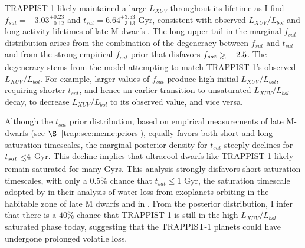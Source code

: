 TRAPPIST-1 likely maintained a large $L_{XUV}$ throughout its lifetime as I find $f_{sat} = -3.03^{+0.23}_{-0.12}$ and $t_{sat} = 6.64^{+3.53}_{-3.13}$ Gyr, consistent with observed $L_{XUV}/L_{bol}$ and long activity lifetimes of late M dwarfs \citep{West2008,Wright2018}. The long upper-tail in the marginal $f_{sat}$ distribution arises from the combination of the degeneracy between $f_{sat}$ and $t_{sat}$ and from the strong empirical $f_{sat}$ prior that disfavors $f_{sat} \gsim -2.5$. The degeneracy stems from the model attempting to match TRAPPIST-1's observed $L_{XUV}/L_{bol}$. For example, larger values of $f_{sat}$ produce high initial $L_{XUV}/L_{bol}$, requiring shorter $t_{sat}$, and hence an earlier transition to unsaturated $L_{XUV}/L_{bol}$ decay, to decrease $L_{XUV}/L_{bol}$ to its observed value, and vice versa. 

Although the $t_{sat}$ prior distribution, based on empirical measurements of late M-dwarfs (see $\S$~\ref{trap:sec:mcmc:priors}), equally favors both short and long saturation timescales, the marginal posterior density for $t_{sat}$ steeply declines for $t_{sat} \lsim 4$ Gyr. This decline implies that ultracool dwarfs like TRAPPIST-1 likely remain saturated for many Gyrs. This analysis strongly disfavors short saturation timescales, with only a $0.5\%$ chance that $t_{sat} \leq 1$ Gyr, the saturation timescale adopted by \citet{Luger2015} in their analysis of water loss from exoplanets orbiting in the habitable zone of late M dwarfs and in \citet{Lincowski2018}. From the posterior distribution, I infer that there is a $40\%$ chance that TRAPPIST-1 is still in the high-$L_{XUV}/L_{bol}$ saturated phase today, suggesting that the TRAPPIST-1 planets could have undergone prolonged volatile loss.

